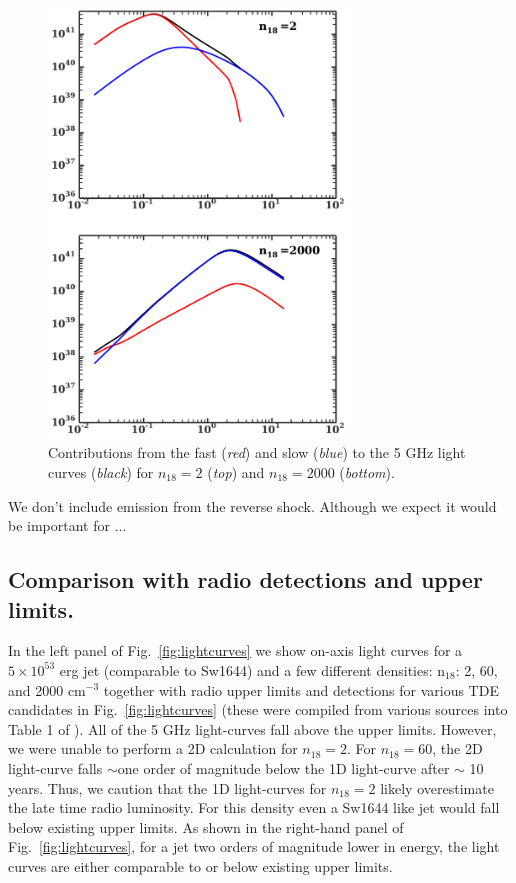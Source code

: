 \documentclass[usenatbib,fleqn]{mnras}
\begin{document}
\begin{figure}
\includegraphics[width=8cm]{components.pdf}
\caption{\label{fig:components} Contributions from the fast
  (\textit{red}) and slow (\textit{blue}) to the 5 GHz light curves
  (\textit{black}) for $n_{18}=2$ (\textit{top}) and $n_{18}=2000$
  (\textit{bottom}).}
\end{figure}

We don't include emission from the reverse
shock. Although we expect it would be important for {...}

\subsection{Comparison with radio detections and upper limits.}

In the left panel of Fig.~\ref{fig:lightcurves} we show on-axis light
curves for a $5\times 10^{53}$ erg jet (comparable to Sw1644) and a
few different densities: n$_{18}$: 2, 60, and 2000 cm$^{-3}$ together
with radio upper limits and detections for various TDE candidates in
Fig.~\ref{fig:lightcurves} (these were compiled from various sources
into Table 1 of \citealt{Mimica+2015}).  All of the 5 GHz light-curves
fall above the upper limits. However, we were unable to perform a 2D
calculation for $n_{18}=2$.  For $n_{18}=60$, the 2D light-curve falls
$\sim$one order of magnitude below the 1D light-curve after $\sim$ 10
years. Thus, we caution that the 1D light-curves for $n_{18}=2$ likely
overestimate the late time radio luminosity. For this density even a
Sw1644 like jet would fall below existing upper limits. As shown in
the right-hand panel of Fig.~\ref{fig:lightcurves}, for a jet two
orders of magnitude lower in energy, the light curves are either
comparable to or below existing upper limits.
\end{document}
